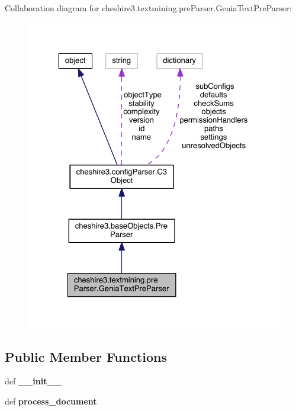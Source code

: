 Collaboration diagram for cheshire3.\-textmining.\-pre\-Parser.\-Genia\-Text\-Pre\-Parser\-:
\nopagebreak
\begin{figure}[H]
\begin{center}
\leavevmode
\includegraphics[width=325pt]{classcheshire3_1_1textmining_1_1pre_parser_1_1_genia_text_pre_parser__coll__graph}
\end{center}
\end{figure}
\subsection*{Public Member Functions}
\begin{DoxyCompactItemize}
\item 
\hypertarget{classcheshire3_1_1textmining_1_1pre_parser_1_1_genia_text_pre_parser_afde86f73c81a209f22b3942d390453c1}{def {\bfseries \-\_\-\-\_\-init\-\_\-\-\_\-}}\label{classcheshire3_1_1textmining_1_1pre_parser_1_1_genia_text_pre_parser_afde86f73c81a209f22b3942d390453c1}

\item 
\hypertarget{classcheshire3_1_1textmining_1_1pre_parser_1_1_genia_text_pre_parser_a4b3992e8f79bd4f88eefbd084901ab33}{def {\bfseries process\-\_\-document}}\label{classcheshire3_1_1textmining_1_1pre_parser_1_1_genia_text_pre_parser_a4b3992e8f79bd4f88eefbd084901ab33}

\end{DoxyCompactItemize}
